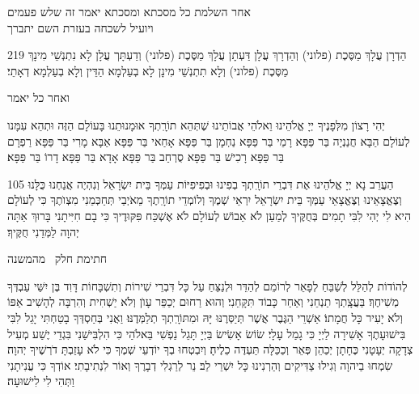 \clearpage

\centerlastline
\small
\parskip 1pt
{\centering
  \scriptsize
   אחר השלמת כל מסכתא ומסכתא יאמר זה שלש פעמים\\ ויועיל לשכחה בעזרת השם יתברך\hdot
}

\begin{tp}{219}
הַדְרָן עֲלָךְ מַסֶּכֶת {\scriptsize(פלוני)} וְהַדְרָךְ עֲלָן\hdot
דַּעְתָן עֲלָךְ מַסֶּכֶת {\scriptsize(פלוני)} וְדַעְתָּך עֲלָן\hdot
לָא נִתְנְשֵׁי מִינָךְ מַסֶּכֶת {\scriptsize(פלוני}) וְלָא תִתְנְשֵׁי מִינָן
לָא בְעַלְמָא הַדֵּין וְלָא בְעַלְמָא דְאָתֵי׃
\end{tp}

{\scriptsize ואחר כל יאמר}

יְהִי רָצוֹן מִלְּפָנֶיךָ יְיָ אֱלֹהֵינוּ וֵאלֹהֵי אֲבוֹתֵינוּ שֶׁתְּהֵא תוֹרָֽתְךָ אוּמָנוּתֵנוּ בָּעוֹלָם הַזֶּה וּתְהֵא עִמָּנו לְעוֹלָם הַבָּא\hdot
חֲנַנְיָה בַּר פַּפָּא\hdot
רָמֵי בַּר פַּפָּא\hdot
נַחְמָן בַּר פַּפָּא\hdot
אָחַאי בַּר פַּפָּא\hdot
אַבָּא מָרִי בַּר פַּפָּא\hdot
רַפְרָם בַּר פַּפָּא\hdot
רָכִישׁ בַּר פַּפָּא\hdot
סֻרְחַב בַּר פַּפָּא\hdot
אָדָא בַּר פַּפָּא\hdot
דָרוֹ בַּר פַּפָּא׃

\begin{tp}{105}
הַעֲרֵב נָא יְיָ אֱלֹהֵינוּ אֶת דִּבְרֵי תוֹרָֽתְךָ בְפִינוּ וּבְפִיפִיּוֹת עַמְּךָ בֵּית יִשְׂרָאֵל וְנִהְיֶה אֲנַחְנוּ כֻּלָּנוּ וְצֶאֱצָאֵינוּ וְצֶאֱצָאֵי עַמְּךָ בֵּית יִשְׂרָאֵל יִרְאֵי שְׁמֶךָ וְלוֹמְדֵי תוֹרָֽתֶךָ\hdot
 מֵאֹיְבַי תְּחַכְּמֵנִי מִצְוֺתֶךָ כִּי לְעוֹלָם הִיא לִי\hdot
 יְהִי לִבִּי תָמִים בְּחֻקֶּיךָ לְמַעַן לֹא אֵבוֹשׁ\hdot
 לְעוֹלָם לֹא אֶשְׁכַּח פִּקּוּדֶיךָ כִּי בָם חִיִּיתָנִי\hdot
  בָּרוּךְ אַתָּה יְהוָה לַמְּדֵנִי חֻקֶּיךָ׃
\end{tp}
  
    {\centering
      \larger חתימת חלק  \sederCount\ מהמשנה 

    }

    לְהוֹדוֹת לְהַלֵּל לְשַׁבֵּחַ לְפָאֵר לְרוֹמֵם לְהַדֵּר וּלְנַצֵּחַ עַל כָּל דִּבְרֵי שִׁירוֹת וְתִשְׁבָּחוֹת דָּוִד בֶּן יִשַּׁי עַבְדְּךָ מְשִׁיחֶךָ׃ בַּעֲצָֽתְךָ תַנְחֵנִי וְאַחַר כָּבוֹד תִּקָּחֵנִי׃
    וְהוּא רַחוּם יְכַפֵּר עָוֺן וְלֹא יַשְׁחִית וְהִרְבָּה לְהָשִׁיב אַפּוֹ וְלֹא יָעִיר כָּל חֲמָתוֹ׃
    אַשְׁרֵי הַגֶּבֶר אֲשֶׁר תְּיַסְּרֶנּוּ יָּהּ וּמִתּוֹרָֽתְךָ תְלַמְּדֶנּוּ׃
    וַאֲנִי בְּחַסְדְּךָ בָטַחְתִּי יָגֵל לִבִּי בִּישׁוּעָתֶךָ אָשִׁירָה לַיְיָ כִּי גָמַל עָלָי׃
    שׂוֹשׂ אָשִׂישׂ בַּיְיָ תָּגֵל נַפְשִׁי בֵּאלֹהַי כִּי הִלְבִּישַׁנִי בִּגְדֵי יֶשַׁע מְעִיל צְדָקָה יְעָטָנִי כֶּחָתָן יְכַהֵן פְּאֵר וְכַכַּלָּה תַּעְדֶּה כֵלֶיהָ׃
    וְיִבְטְחוּ בְךָ יוֹדְעֵי שְׁמֶךָ כִּי לֹא עָזַבְתָּ דֹרְשֶׁיךָ יְהוָה׃
    שִׂמְחוּ בַיהוָה וְגִילוּ צַדִּיקִים וְהַרְנִינוּ כָּל יִשְׁרֵי לֵב׃
    נֵר לְרַגְלִי דְבָרֶךָ וְאוֹר לִנְתִיבָתִי׃
    אוֹדְךָ כִּי עֲנִיתָנִי וַתְּהִי לִי לִישׁוּעָה׃
    
